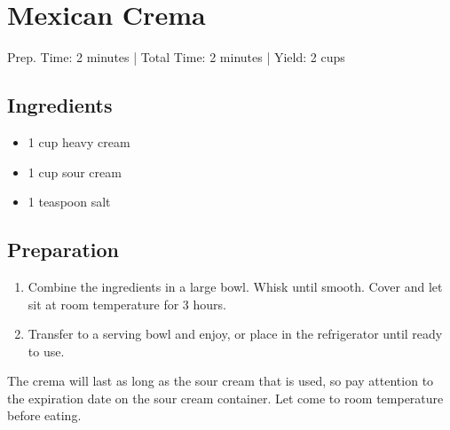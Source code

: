 \section{Mexican Crema}

Prep. Time: 2 minutes |
Total Time: 2 minutes |
Yield: 2 cups

\subsection{Ingredients}
\begin{itemize}
    \item 1 cup heavy cream
    \item 1 cup sour cream
    \item 1 teaspoon salt
\end{itemize}

\subsection{Preparation}
\begin{enumerate}
    \item Combine the ingredients in a large bowl. Whisk until smooth. Cover and let sit at room temperature for 3 hours.
    \item Transfer to a serving bowl and enjoy, or place in the refrigerator until ready to use. 
\end{enumerate}

The crema will last as long as the sour cream that is used, so pay attention to the expiration date on the sour cream container. Let come to room temperature before eating.

